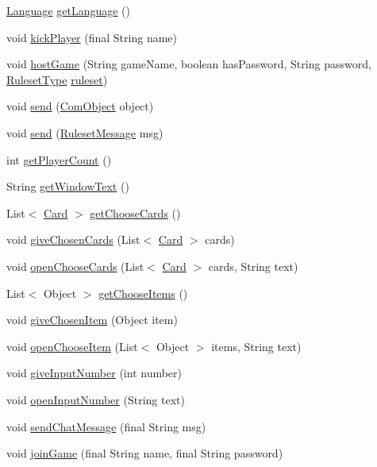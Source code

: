\begin{DoxyCompactItemize}
\item 
\hyperlink{a00015}{Language} \hyperlink{a00003_aa72e75463872de401983258a6554aad6}{get\-Language} ()
\item 
void \hyperlink{a00003_a99949d94213cba9f7f74c6673838fa03}{kick\-Player} (final String name)
\item 
void \hyperlink{a00003_a7878557a5c9e7d77766beeb3662934a4}{host\-Game} (String game\-Name, boolean has\-Password, String password, \hyperlink{a00066}{Ruleset\-Type} \hyperlink{a00003_a9c280012d0d8f96783ebdeee9c22b646}{ruleset})
\item 
void \hyperlink{a00003_afea035a8450d55661a10d4727154498d}{send} (\hyperlink{a00037}{Com\-Object} object)
\item 
void \hyperlink{a00003_a26c0fa3eb71d468c72e80f7cc05ae375}{send} (\hyperlink{a00053}{Ruleset\-Message} msg)
\item 
int \hyperlink{a00003_a257a047419807db825874e5a047ea014}{get\-Player\-Count} ()
\item 
String \hyperlink{a00003_abe9d18c5dad27296dcb59f4240a9f0ce}{get\-Window\-Text} ()
\item 
List$<$ \hyperlink{a00054}{Card} $>$ \hyperlink{a00003_a7ded1d3a4be43354c103da022b77bbc1}{get\-Choose\-Cards} ()
\item 
void \hyperlink{a00003_afb96022738b6f1ff57bde67d0d53ed99}{give\-Chosen\-Cards} (List$<$ \hyperlink{a00054}{Card} $>$ cards)
\item 
void \hyperlink{a00003_a81252c27707ce875ea36918d98e1ed86}{open\-Choose\-Cards} (List$<$ \hyperlink{a00054}{Card} $>$ cards, String text)
\item 
List$<$ Object $>$ \hyperlink{a00003_a550681b0f7b65985b5c01d0f177844b7}{get\-Choose\-Items} ()
\item 
void \hyperlink{a00003_ac1ce576e2e6ac7a32f46cf17cd018ef5}{give\-Chosen\-Item} (Object item)
\item 
void \hyperlink{a00003_a42c528c780b3d24d2c78346838b3750f}{open\-Choose\-Item} (List$<$ Object $>$ items, String text)
\item 
void \hyperlink{a00003_a8b05e745ce1cb7d38a171e5be7579fdd}{give\-Input\-Number} (int number)
\item 
void \hyperlink{a00003_ab654fcf26e04104bcb42ff6413af16cc}{open\-Input\-Number} (String text)
\item 
void \hyperlink{a00003_a88ce6a659f690c335b5172f4fc8d6692}{send\-Chat\-Message} (final String msg)
\item 
void \hyperlink{a00003_a0c256b4ccc940e2aee2365e06e9d9937}{join\-Game} (final String name, final String password)

\end{DoxyCompactItemize}
